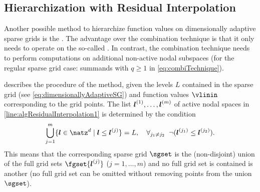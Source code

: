 \subsection{Hierarchization with Residual Interpolation}
\label{sec:433residualInterpolation}

Another possible method to hierarchize function values on
dimensionally adaptive sparse grids is the
.
The advantage over the combination technique is that
it only needs to operate on the so-called .
In contrast, the combination technique needs to perform computations
on additional non-active nodal subspaces
(for the regular sparse grid case:
summands with $q \ge 1$ in \eqref{eq:combiTechnique}).

 describes the procedure of the method,
given the levels $L$ contained in the sparse grid
(see \eqref{eq:dimensionallyAdaptiveSG})
and function values $\vlinin$ corresponding to the grid points.
The list ${\boldsymbol{l}}^{(1)}, \dotsc, {\boldsymbol{l}}^{(m)}$ of active nodal spaces
in \cref{line:algResidualInterpolation1} is determined by the condition
\begin{equation}
  \bigcup_{j=1}^m \{\*l \in \natz^d \mid \*l \le \*l^{(j)}\} = L,\quad
  \falarge{j_1 \not= j_2}{\lnot(\*l^{(j_1)} \le \*l^{(j_2)})}.
\end{equation}
This means that the corresponding sparse grid $\sgset$
is the (non-disjoint) union of the full grid sets $\fgset{\*l^{(j)}}$
($j = 1, \dotsc, m$)
and no full grid set is contained is another
(no full grid set can be omitted without
removing points from the union $\sgset$).

